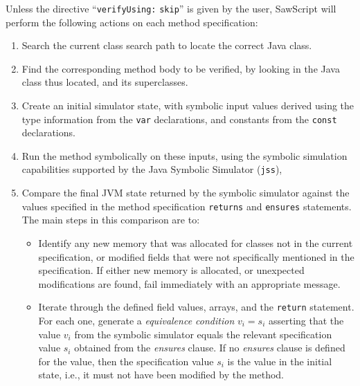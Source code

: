 \documentclass[12pt]{galois-whitepaper}
\newcommand{\sawScript}{{\sc SawScript}\xspace}
\begin{document}
Unless the directive ``{\tt verifyUsing:} {\tt skip}'' is given by the user, \sawScript will perform the following actions
on each method specification:

\begin{enumerate}

\item Search the current class search path to locate the correct Java class.

\item Find the corresponding method body to be verified, by looking in the
        Java class thus located, and its superclasses.

\item Create an initial simulator state, with symbolic input values derived
        using the type information from the {\tt var} declarations, and
        constants from the {\tt const} declarations.  
        \label{enum:simulator}

\item Run the method symbolically on these inputs, using the symbolic
        simulation capabilities supported by the Java Symbolic Simulator
        ({\tt{}jss}),

\item Compare the final JVM state returned by the symbolic simulator against
        the values specified in the method specification {\tt returns} and
        {\tt ensures} statements.  The main steps in this comparison are to:
        
 \begin{itemize}

   \item Identify any new memory that was allocated for classes not in the current
           specification, or modified fields that were not specifically
           mentioned in the specification.  If either new memory is allocated, or unexpected
           modifications are found, fail immediately with an appropriate message.

   \item Iterate through the defined field values, arrays, and the {\tt return} statement.
           For each one, generate a \emph{equivalence condition} $v_i = s_i$ asserting
           that the value $v_i$ from the symbolic simulator equals the relevant
           specification value $s_i$ obtained from the \emph{ensures} clause.
           If no \emph{ensures} clause is defined for the value, then
           the specification value $s_i$ is the value in the initial state, i.e., it must
           not have been modified by the method.


\end{itemize}
\end{enumerate}
\end{document}
